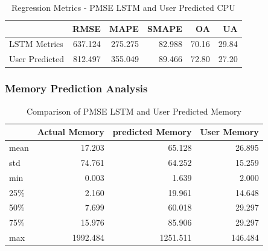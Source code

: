       \begin{table}
        \centering
        \caption{Regression Metrics - PMSE LSTM and User Predicted CPU}
        \label{tab:regression-metrics-pmse-lstm-user-predicted-cpu}

        \begin{tabular}{|l|rrrrr|}
          \toprule
          {} &     RMSE &     MAPE &   SMAPE &     OA &     UA \\
          \midrule
          LSTM Metrics   &  637.124 &  275.275 &  82.988 &  70.16 &  29.84 \\
          User Predicted &  812.497 &  355.049 &  89.466 &  72.80 &  27.20 \\
          \bottomrule
        \end{tabular}
      \end{table}

    \subsubsection{Memory Prediction Analysis}
    \label{sec:mem-prediction-analysis-psme-lstm-evaluation}

      \begin{table}
        \centering
        \caption{Comparison of PMSE LSTM and User Predicted Memory}
        \label{tab:comparison-pmse-lstm-user-predicted-memory}

        \begin{tabular}{|l|rrr|}
          \toprule
          {} &  Actual Memory &  predicted Memory &  User Memory \\
          \midrule
          mean &            17.203 &               65.128 &         26.895 \\
          std  &            74.761 &               64.252 &         15.259 \\
          min  &             0.003 &                1.639 &          2.000 \\
          25\%  &             2.160 &               19.961 &         14.648 \\
          50\%  &             7.699 &               60.018 &         29.297 \\
          75\%  &            15.976 &               85.906 &         29.297 \\
          max  &          1992.484 &             1251.511 &        146.484 \\
          \bottomrule
        \end{tabular}
      \end{table}
      
